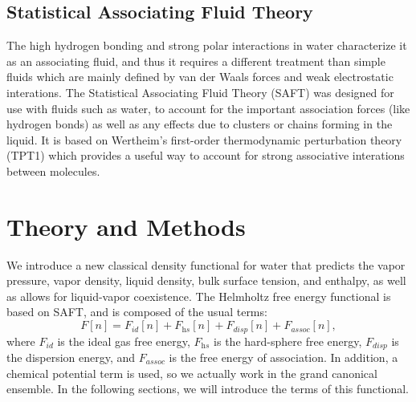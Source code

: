 \documentclass[letterpaper,twocolumn,amsmath,amssymb,prb]{revtex4-1}
\begin{document}
\subsection{Statistical Associating Fluid Theory}

The high hydrogen bonding and strong polar interactions in water characterize it
as an associating fluid, and thus it requires a different treatment than simple
fluids which are mainly defined by van der Waals forces and weak electrostatic
interations. The Statistical Associating Fluid Theory (SAFT) was designed for
use with fluids such as water, to account for the important association forces
(like hydrogen bonds) as well as any effects due to clusters or chains forming
in the liquid\cite{muller2001molecular}. It is based on Wertheim's first-order
thermodynamic perturbation theory (TPT1)
\cite{wertheim1984fluidsI,wertheim1984fluidsII,wertheim1986fluidsIII,
wertheim1986fluidsIV} which provides a useful way to account for strong
associative interations between molecules.

\section{Theory and Methods}
We introduce a new classical density functional for water that
predicts the vapor pressure, vapor density, liquid density, bulk
surface tension, and enthalpy, as well as allows for liquid-vapor
coexistence.  The Helmholtz free energy functional is based on SAFT,
and is composed of the usual terms:
\begin{equation}
  F[n] = F_\textit{id}[n] + F_\textit{hs}[n]  +
F_\textit{disp}[n]+ F_\textit{assoc}[n],
\end{equation}
where $F_\textit{id}$ is the ideal gas free energy, $F_\textit{hs}$ is
the hard-sphere free energy, $F_\textit{disp}$ is the dispersion energy,
and $F_\textit{assoc}$ is the free energy of association.  In
addition, a chemical potential term is used, so we actually work in
the grand canonical ensemble.  In the following sections, we will
introduce the terms of this functional.
\end{document}
